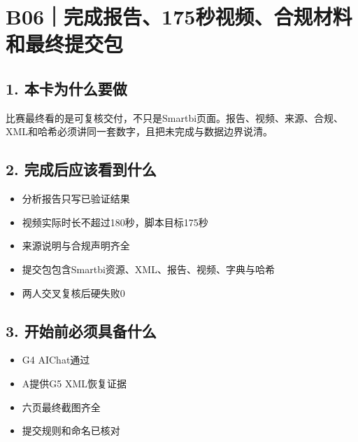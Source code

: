 \documentclass[UTF8,openany,zihao=-4]{ctexbook}
\renewcommand{\_}{\textunderscore\allowbreak}
\begin{document}
\clearpage
\section{B06｜完成报告、175秒视频、合规材料和最终提交包}
\subsection*{1. 本卡为什么要做}
比赛最终看的是可复核交付，不只是Smartbi页面。报告、视频、来源、合规、XML和哈希必须讲同一套数字，且把未完成与数据边界说清。


\subsection*{2. 完成后应该看到什么}
\begin{itemize}
\item 分析报告只写已验证结果
\item 视频实际时长不超过180秒，脚本目标175秒
\item 来源说明与合规声明齐全
\item 提交包包含Smartbi资源、XML、报告、视频、字典与哈希
\item 两人交叉复核后硬失败0
\end{itemize}

\subsection*{3. 开始前必须具备什么}
\begin{itemize}[label=$\square$]
\item G4 AIChat通过
\item A提供G5 XML恢复证据
\item 六页最终截图齐全
\item 提交规则和命名已核对
\end{itemize}
\end{document}
